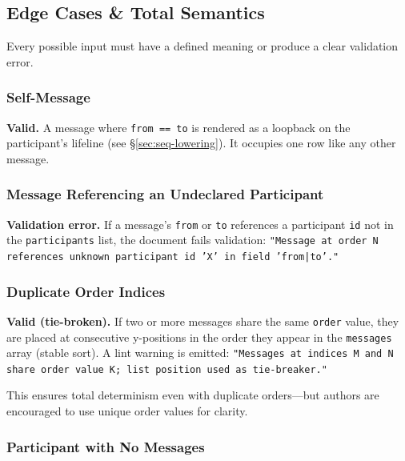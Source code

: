 \subsection{Edge Cases \& Total Semantics}
\label{sec:seq-edge-cases}

Every possible input must have a defined meaning or produce a clear validation error.

\subsubsection{Self-Message}

\textbf{Valid.} A message where \texttt{from == to} is rendered as a loopback on the participant's lifeline (see \S\ref{sec:seq-lowering}). It occupies one row like any other message.

\subsubsection{Message Referencing an Undeclared Participant}

\textbf{Validation error.} If a message's \texttt{from} or \texttt{to} references a participant \texttt{id} not in the \texttt{participants} list, the document fails validation: \texttt{"Message at order N references unknown participant id 'X' in field 'from|to'."}

\subsubsection{Duplicate Order Indices}

\textbf{Valid (tie-broken).} If two or more messages share the same \texttt{order} value, they are placed at consecutive y-positions in the order they appear in the \texttt{messages} array (stable sort). A lint warning is emitted: \texttt{"Messages at indices M and N share order value K; list position used as tie-breaker."}

This ensures total determinism even with duplicate orders---but authors are encouraged to use unique order values for clarity.

\subsubsection{Participant with No Messages}

